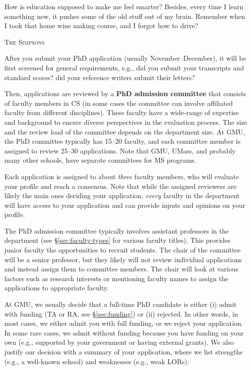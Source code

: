 \documentclass[oneside,11pt]{memoir}
\begin{document}
\epigraph{How is education supposed to make me feel smarter? Besides, every time I learn something new, it pushes some of the old stuff out of my brain. Remember when I took that home wine making course, and I forgot how to drive?}{\textsc{The Simpsons}}

After you submit your PhD application (usually November--December), it will be first screened
for general requirements, e.g., did you submit your transcripts and standard scores? did your reference writers submit their letters?

Then, applications are reviewed by a \textbf{PhD admission committee} that consists of faculty members in CS (in some cases the committee can involve affiliated faculty from different disciplines). These faculty have a wide-range of expertise and background to ensure diverse perspectives in the evaluation process. The size and the review load of the committee depends on the department size. At GMU, the PhD committee typically has 15--20 faculty, and each committee member is assigned to review 25--30 applications. Note that GMU, UMass, and probably many other schools, have separate committees for MS programs.

Each application is assigned to about \emph{three} faculty members, who will evaluate your profile and reach a consensus.  Note that while the assigned reviewers are likely the main ones deciding your application, \emph{every} faculty in the department will have access to your application and can provide inputs and opinions on your profile.

The PhD admission committee typically involves assistant professors in the department (see \S\ref{sec:faculty-types} for various faculty titles). This provides junior faculty the opportunities to recruit students. The chair of the committee will be a senior professor, but they likely will not review individual applications and instead assign them to committee members. The chair will look at various factors such as research interests or mentioning faculty names to assign the applications to appropriate faculty. 

At GMU, we usually decide that a full-time PhD candidate is either (i) admit with funding (TA or RA, see \S\ref{sec:funding}) or (ii) rejected. In other words, in most cases, we either
admit you with full funding, or we reject your application. In some rare cases, we admit
without funding because you have funding on your own (e.g.,
supported by your government or having external grants). We also justify
our decision with a summary of your application, where we list
strengths (e.g., a well-known school) and weaknesses (e.g., weak
LORs). 
\end{document}
